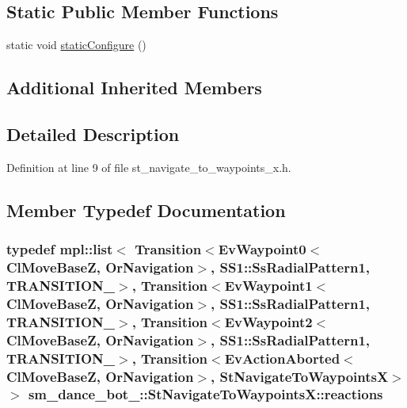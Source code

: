 \subsection*{Static Public Member Functions}
\begin{DoxyCompactItemize}
\item 
static void \hyperlink{structsm__dance__bot__2_1_1StNavigateToWaypointsX_a26d98f77a368869d44ebf535c100df8c}{static\+Configure} ()
\end{DoxyCompactItemize}
\subsection*{Additional Inherited Members}


\subsection{Detailed Description}


Definition at line 9 of file st\+\_\+navigate\+\_\+to\+\_\+waypoints\+\_\+x.\+h.



\subsection{Member Typedef Documentation}
\subsubsection[{\texorpdfstring{reactions}{reactions}}]{\setlength{\rightskip}{0pt plus 5cm}typedef mpl\+::list$<$ Transition$<${\bf Ev\+Waypoint0}$<${\bf Cl\+Move\+BaseZ}, {\bf Or\+Navigation}$>$, {\bf S\+S1\+::\+Ss\+Radial\+Pattern1}, {\bf T\+R\+A\+N\+S\+I\+T\+I\+O\+N\+\_}$>$, Transition$<${\bf Ev\+Waypoint1}$<${\bf Cl\+Move\+BaseZ}, {\bf Or\+Navigation}$>$, {\bf S\+S1\+::\+Ss\+Radial\+Pattern1}, {\bf T\+R\+A\+N\+S\+I\+T\+I\+O\+N\+\_}$>$, Transition$<${\bf Ev\+Waypoint2}$<${\bf Cl\+Move\+BaseZ}, {\bf Or\+Navigation}$>$, {\bf S\+S1\+::\+Ss\+Radial\+Pattern1}, {\bf T\+R\+A\+N\+S\+I\+T\+I\+O\+N\+\_}$>$, Transition$<$Ev\+Action\+Aborted$<${\bf Cl\+Move\+BaseZ}, {\bf Or\+Navigation}$>$, {\bf St\+Navigate\+To\+WaypointsX}$>$ $>$ {\bf sm\+\_\+dance\+\_\+bot\+\_\+::\+St\+Navigate\+To\+Waypoints\+X\+::reactions}}\hypertarget{structsm__dance__bot__2_1_1StNavigateToWaypointsX_a324e1d36077605571edf69adac5e7d26}{}\label{structsm__dance__bot__2_1_1StNavigateToWaypointsX_a324e1d36077605571edf69adac5e7d26}


